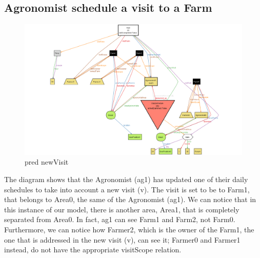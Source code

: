 \documentclass[10pt]{report}
\begin{document}
\subsection{Agronomist schedule a visit to a Farm}
\begin{figure}[H]
    \centering
    \includegraphics[width=450px]{Alloy/newVisit.png}
    \caption{pred newVisit}
\end{figure}
The diagram shows that the Agronomist (ag1) has updated one of their daily schedules to take into account a new visit (v). The visit is set to be to Farm1, that belongs to Area0, the same of the Agronomist (ag1). We can notice that in this instance of our model, there is another area, Area1, that is completely separated from Area0. In fact, ag1 can see Farm1 and Farm2, not Farm0. Furthermore, we can notice how Farmer2, which is the owner of the Farm1, the one that is addressed in the new visit (v), can see it; Farmer0 and Farmer1 instead, do not have the appropriate visitScope relation.
\end{document}
